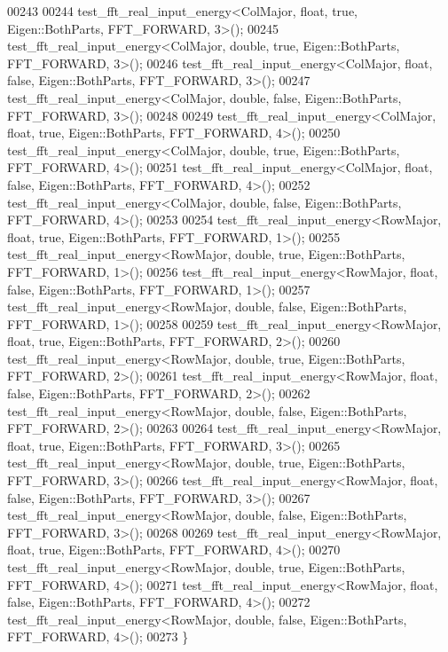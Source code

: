 \begin{DoxyCode}
00243 
00244     test\_fft\_real\_input\_energy<ColMajor, float,  true,  Eigen::BothParts, FFT\_FORWARD, 3>();
00245     test\_fft\_real\_input\_energy<ColMajor, double, true,  Eigen::BothParts, FFT\_FORWARD, 3>();
00246     test\_fft\_real\_input\_energy<ColMajor, float,  false,  Eigen::BothParts, FFT\_FORWARD, 3>();
00247     test\_fft\_real\_input\_energy<ColMajor, double, false,  Eigen::BothParts, FFT\_FORWARD, 3>();
00248 
00249     test\_fft\_real\_input\_energy<ColMajor, float,  true,  Eigen::BothParts, FFT\_FORWARD, 4>();
00250     test\_fft\_real\_input\_energy<ColMajor, double, true,  Eigen::BothParts, FFT\_FORWARD, 4>();
00251     test\_fft\_real\_input\_energy<ColMajor, float,  false,  Eigen::BothParts, FFT\_FORWARD, 4>();
00252     test\_fft\_real\_input\_energy<ColMajor, double, false,  Eigen::BothParts, FFT\_FORWARD, 4>();
00253 
00254     test\_fft\_real\_input\_energy<RowMajor, float,  true,  Eigen::BothParts, FFT\_FORWARD, 1>();
00255     test\_fft\_real\_input\_energy<RowMajor, double, true,  Eigen::BothParts, FFT\_FORWARD, 1>();
00256     test\_fft\_real\_input\_energy<RowMajor, float,  false,  Eigen::BothParts, FFT\_FORWARD, 1>();
00257     test\_fft\_real\_input\_energy<RowMajor, double, false,  Eigen::BothParts, FFT\_FORWARD, 1>();
00258 
00259     test\_fft\_real\_input\_energy<RowMajor, float,  true,  Eigen::BothParts, FFT\_FORWARD, 2>();
00260     test\_fft\_real\_input\_energy<RowMajor, double, true,  Eigen::BothParts, FFT\_FORWARD, 2>();
00261     test\_fft\_real\_input\_energy<RowMajor, float,  false,  Eigen::BothParts, FFT\_FORWARD, 2>();
00262     test\_fft\_real\_input\_energy<RowMajor, double, false,  Eigen::BothParts, FFT\_FORWARD, 2>();
00263 
00264     test\_fft\_real\_input\_energy<RowMajor, float,  true,  Eigen::BothParts, FFT\_FORWARD, 3>();
00265     test\_fft\_real\_input\_energy<RowMajor, double, true,  Eigen::BothParts, FFT\_FORWARD, 3>();
00266     test\_fft\_real\_input\_energy<RowMajor, float,  false,  Eigen::BothParts, FFT\_FORWARD, 3>();
00267     test\_fft\_real\_input\_energy<RowMajor, double, false,  Eigen::BothParts, FFT\_FORWARD, 3>();
00268 
00269     test\_fft\_real\_input\_energy<RowMajor, float,  true,  Eigen::BothParts, FFT\_FORWARD, 4>();
00270     test\_fft\_real\_input\_energy<RowMajor, double, true,  Eigen::BothParts, FFT\_FORWARD, 4>();
00271     test\_fft\_real\_input\_energy<RowMajor, float,  false,  Eigen::BothParts, FFT\_FORWARD, 4>();
00272     test\_fft\_real\_input\_energy<RowMajor, double, false,  Eigen::BothParts, FFT\_FORWARD, 4>();
00273 \}
\end{DoxyCode}
